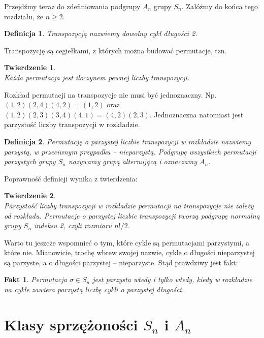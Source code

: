 \documentclass[licencjacka]{pracamgr}
\newtheorem{deff}{Definicja}[section]
\newtheorem{thh}{Twierdzenie}[section]
\newtheorem{fact}{Fakt}[section]
\begin{document}
\pagebreak[2]

Przejdźmy teraz do zdefiniowania podgrupy $A_n$ grupy $S_n$.
Załóżmy do końca tego rozdziału, że $n \ge 2$.

\begin{deff}
	\emph{Transpozycją} nazwiemy dowolny cykl długości 2.
\end{deff}

Transpozycję są cegiełkami, z których można budować permutacje, tzn.

\begin{thh} $ $ \\
	Każda permutacja jest iloczynem pewnej liczby transpozycji.
\end{thh}

Rozkład permutacji na transpozycje nie musi być jednoznaczny.
Np. $(1, 2) (2, 4) (4, 2) = (1, 2)$ oraz $(1, 2) (2, 3) (3, 4) (4, 1) = (4, 2) (2, 3)$.
Jednoznaczna natomiast jest parzystość liczby transpozycji w rozkładzie.

\begin{deff}
	Permutację o parzystej liczbie transpozycji w rozkładzie nazwiemy \emph{parzystą}, 
	w przeciwnym przypadku -- \emph{nieparzystą}.
	Podgrupę wszystkich permutacji parzystych grupy $S_n$ nazywamy \emph{grupą alternującą} i oznaczamy $A_n$.
\end{deff}


Poprawność definicji wynika z twierdzenia:

\begin{thh} $ $ \\
	Parzystość liczby transpozycji w rozkładzie permutacji na transpozycje nie zależy od rozkładu.
	Permutacje o parzystej liczbie transpozycji tworzą podgrupę normalną grupy $S_n$ indeksu 2, czyli rozmiaru $n!/2$.
\end{thh}

Warto tu jeszcze wspomnieć o tym, które cykle są permutacjami parzystymi, a które nie.
Mianowicie, trochę wbrew swojej nazwie, cykle o długości nieparzystej są parzyste, 
a o długości parzystej -- nieparzyste.
Stąd prawdziwy jest fakt:

\begin{fact}
	Permutacja $\sigma \in S_n$ jest parzysta wtedy i tylko wtedy, kiedy w rozkładzie na cykle 
	zawiera parzystą liczbę cykli o parzystej długości.
\end{fact}


\section{Klasy sprzężoności $S_n$ i $A_n$}
\end{document}

